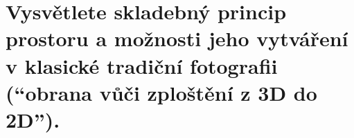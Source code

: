 \section{Vysvětlete skladebný princip prostoru a možnosti jeho vytváření v klasické tradiční fotografii 
(\enquote{obrana vůči zploštění z 3D do 2D}).}
